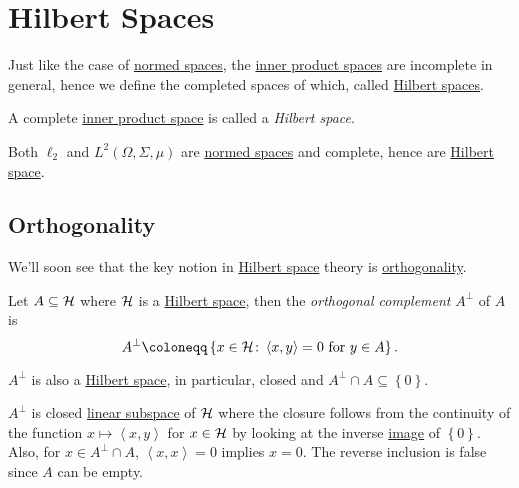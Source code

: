 \section{Hilbert Spaces}
Just like the case of \hyperref[def:normed-vector-space]{normed spaces}, the \hyperref[def:inner-product-space]{inner product spaces} are incomplete in general, hence we define the completed spaces of which, called \hyperref[def:Hilbert-space]{Hilbert spaces}.
\begin{definition}\label{def:Hilbert-space}
	A complete \hyperref[def:inner-product-space]{inner product space} is called a \emph{Hilbert space}.
\end{definition}

\begin{eg}
	Both \(\ell _2\) and \(L^2(\Omega , \Sigma , \mu )\) are \hyperref[def:normed-vector-space]{normed spaces} and complete, hence are \hyperref[def:Hilbert-space]{Hilbert space}.
\end{eg}

\subsection{Orthogonality}
We'll soon see that the key notion in \hyperref[def:Hilbert-space]{Hilbert space} theory is \hyperref[def:orthogonal]{orthogonality}.
\begin{definition}\label{def:orthogonal-complement}
	Let \(A \subseteq \mathcal{\MakeUppercase{h}} \) where \(\mathcal{\MakeUppercase{h}}\) is a \hyperref[def:Hilbert-space]{Hilbert space}, then the \emph{orthogonal complement} \(A^\perp\) of \(A\) is
	\[
		A^\perp \coloneqq \left\{ x\in \mathcal{\MakeUppercase{h}} \colon \left\langle x, y \right\rangle = 0 \text{ for } y\in A \right\}.
	\]
\end{definition}

\begin{remark}
	\(A^\perp\) is also a \hyperref[def:Hilbert-space]{Hilbert space}, in particular, closed and \(A^\perp \cap A \subseteq \left\{ 0 \right\} \).
\end{remark}
\begin{explanation}
	\(A^\perp\) is closed \hyperref[def:linear-vector-space]{linear subspace} of \(\mathcal{\MakeUppercase{h}} \) where the closure follows from the continuity of the function \(x\mapsto \left\langle x, y \right\rangle \) for \(x\in \mathcal{\MakeUppercase{h}} \) by looking at the inverse \hyperref[def:image]{image} of \(\left\{ 0 \right\}\). Also, for \(x\in A^\perp \cap A\), \(\left\langle x, x \right\rangle = 0\) implies \(x = 0\). The reverse inclusion is false since \(A\) can be empty.
\end{explanation}

